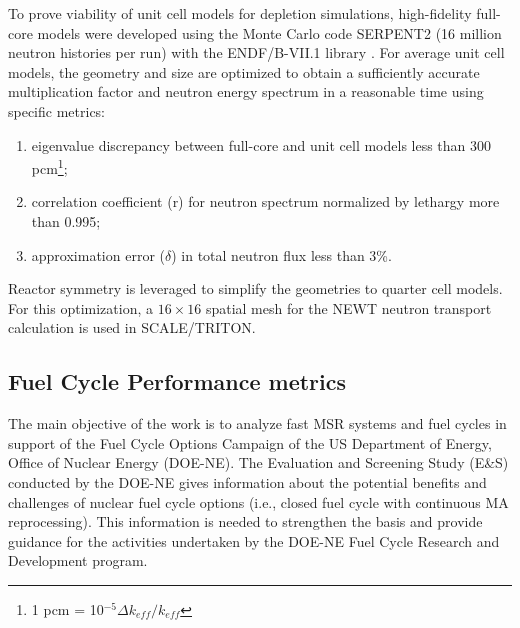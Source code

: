 \documentclass{anstrans}
\begin{document}
To prove viability of unit cell models for depletion simulations, high-fidelity full-core models were developed using the Monte Carlo code SERPENT2 (16 million neutron histories per run) with the ENDF/B-VII.1 library \cite{leppanen_serpent_2015, chadwick_endf/b-vii.1_2011}. For average unit cell models, the geometry and size are optimized to obtain a sufficiently accurate multiplication factor and neutron energy spectrum in a reasonable time using specific metrics:
\vspace{-0.08in}
\begin{enumerate}
	\item eigenvalue discrepancy between full-core and unit cell models less than 300 pcm\footnote{ 1 pcm = 10$^{-5}\Delta k_{eff}/k_{eff}$};\vspace{-0.11in}
	\item correlation coefficient (r) for neutron spectrum normalized by lethargy more than 0.995;\vspace{-0.11in}
	\item approximation error ($\delta$) in total neutron flux less than 3\%.\vspace{-0.08in}
\end{enumerate}
Reactor symmetry is leveraged to simplify the geometries to quarter cell models. For this optimization, a $16\times 16$ spatial mesh for the NEWT neutron transport calculation is used in SCALE/TRITON.

\subsection{Fuel Cycle Performance metrics} 
\label{sec:metrics}
The main objective of the work is to analyze fast \gls{MSR} systems and fuel cycles in support of the Fuel Cycle Options Campaign of the US Department of Energy, Office of Nuclear Energy (DOE-NE). The Evaluation and Screening Study (E\&S) conducted by the DOE-NE gives information about the potential benefits and challenges of nuclear fuel cycle options (i.e., closed fuel cycle with continuous \gls{MA} reprocessing). This information is needed to strengthen the basis and provide guidance for the activities undertaken by the DOE-NE Fuel Cycle Research and Development program.
\end{document}
